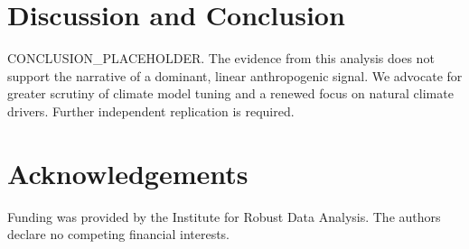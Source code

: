 \documentclass[12pt]{article}
\begin{document}
\section{Discussion and Conclusion}
CONCLUSION_PLACEHOLDER. The evidence from this analysis does not support the narrative of a dominant, linear anthropogenic signal. We advocate for greater scrutiny of climate model tuning and a renewed focus on natural climate drivers. Further independent replication is required.

\section*{Acknowledgements}
Funding was provided by the Institute for Robust Data Analysis. The authors declare no competing financial interests.



\end{document}
